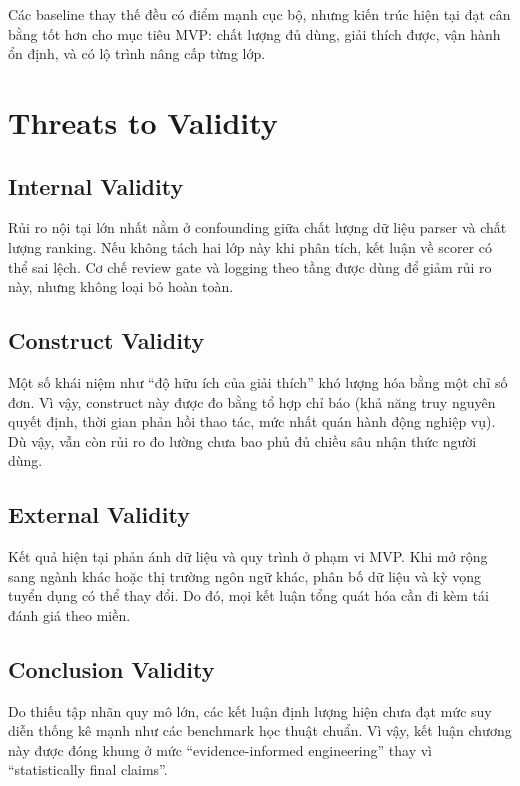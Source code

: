 Các baseline thay thế đều có điểm mạnh cục bộ, nhưng kiến trúc hiện tại đạt cân bằng tốt hơn cho mục tiêu MVP: chất lượng đủ dùng, giải thích được, vận hành ổn định, và có lộ trình nâng cấp từng lớp.

\section{Threats to Validity}

\subsection{Internal Validity}

Rủi ro nội tại lớn nhất nằm ở confounding giữa chất lượng dữ liệu parser và chất lượng ranking. Nếu không tách hai lớp này khi phân tích, kết luận về scorer có thể sai lệch. Cơ chế review gate và logging theo tầng được dùng để giảm rủi ro này, nhưng không loại bỏ hoàn toàn.

\subsection{Construct Validity}

Một số khái niệm như ``độ hữu ích của giải thích'' khó lượng hóa bằng một chỉ số đơn. Vì vậy, construct này được đo bằng tổ hợp chỉ báo (khả năng truy nguyên quyết định, thời gian phản hồi thao tác, mức nhất quán hành động nghiệp vụ). Dù vậy, vẫn còn rủi ro đo lường chưa bao phủ đủ chiều sâu nhận thức người dùng.

\subsection{External Validity}

Kết quả hiện tại phản ánh dữ liệu và quy trình ở phạm vi MVP. Khi mở rộng sang ngành khác hoặc thị trường ngôn ngữ khác, phân bố dữ liệu và kỳ vọng tuyển dụng có thể thay đổi. Do đó, mọi kết luận tổng quát hóa cần đi kèm tái đánh giá theo miền.

\subsection{Conclusion Validity}

Do thiếu tập nhãn quy mô lớn, các kết luận định lượng hiện chưa đạt mức suy diễn thống kê mạnh như các benchmark học thuật chuẩn. Vì vậy, kết luận chương này được đóng khung ở mức ``evidence-informed engineering'' thay vì ``statistically final claims''.

